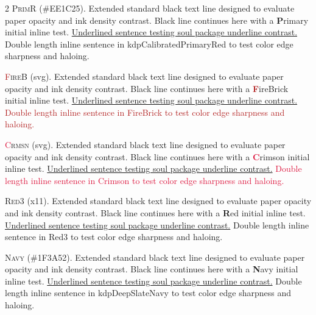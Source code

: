 \documentclass[9pt]{article}
\let\oldlettrine\lettrine
\renewcommand{\lettrine}[3][]{%
	\clubpenalty=10000
	\oldlettrine[#1]{#2}{#3}%
}
\begin{document}
\begin{multicols}{2}
\lettrine[lines=2]{\textcolor{kdpCalibratedPrimaryRed}{P}}{rimR} (\#EE1C25). Extended standard black text line designed to evaluate paper opacity and ink density contrast. Black line continues here with a \textbf{\textcolor{kdpCalibratedPrimaryRed}{P}}rimary initial inline test. \ul{Underlined sentence testing soul package underline contrast.} \textcolor{kdpCalibratedPrimaryRed}{Double length inline sentence in kdpCalibratedPrimaryRed to test color edge sharpness and haloing.}
\medskip

\lettrine[lines=2]{\textcolor{FireBrick}{F}}{ireB} (svg). Extended standard black text line designed to evaluate paper opacity and ink density contrast. Black line continues here with a \textbf{\textcolor{FireBrick}{F}}ireBrick initial inline test. \ul{Underlined sentence testing soul package underline contrast.} \textcolor{FireBrick}{Double length inline sentence in FireBrick to test color edge sharpness and haloing.}
\medskip

\lettrine[lines=2]{\textcolor{Crimson}{C}}{rmsn} (svg). Extended standard black text line designed to evaluate paper opacity and ink density contrast. Black line continues here with a \textbf{\textcolor{Crimson}{C}}rimson initial inline test. \ul{Underlined sentence testing soul package underline contrast.} \textcolor{Crimson}{Double length inline sentence in Crimson to test color edge sharpness and haloing.}
\medskip

\lettrine[lines=2]{\textcolor{Red3}{R}}{ed3} (x11). Extended standard black text line designed to evaluate paper opacity and ink density contrast. Black line continues here with a \textbf{\textcolor{Red3}{R}}ed initial inline test. \ul{Underlined sentence testing soul package underline contrast.} \textcolor{Red3}{Double length inline sentence in Red3 to test color edge sharpness and haloing.}
\medskip


\lettrine[lines=2]{\textcolor{kdpDeepSlateNavy}{N}}{avy} (\#1F3A52). Extended standard black text line designed to evaluate paper opacity and ink density contrast. Black line continues here with a \textbf{\textcolor{kdpDeepSlateNavy}{N}}avy initial inline test. \ul{Underlined sentence testing soul package underline contrast.} \textcolor{kdpDeepSlateNavy}{Double length inline sentence in kdpDeepSlateNavy to test color edge sharpness and haloing.}
\medskip


\end{multicols}
\end{document}
